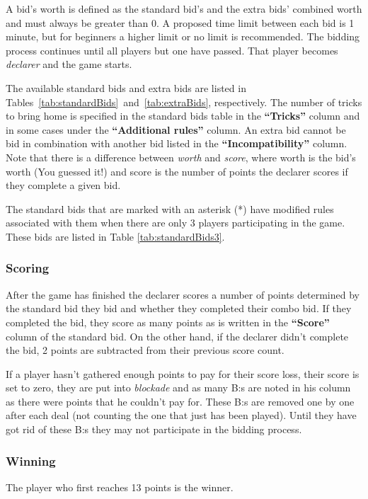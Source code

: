 \documentclass[a4paper]{article}
\begin{document}
			A bid's worth is defined as the standard bid's and the extra bids' combined worth and must always be greater than 0. A proposed time limit between each bid is 1 minute, but for beginners a higher limit or no limit is recommended. The bidding process continues until all players but one have passed. That player becomes \emph{declarer} and the game starts.
			
			The available standard bids and extra bids are listed in Tables~\ref{tab:standardBids}~and~\ref{tab:extraBids}, respectively. The number of tricks to bring home is specified in the standard bids table in the \textbf{``Tricks''} column and in some cases under the \textbf{``Additional rules''} column. An extra bid cannot be bid in combination with another bid listed in the \textbf{``Incompatibility''} column. Note that there is a difference between \emph{worth} and \emph{score}, where worth is the bid's worth (You guessed it!) and score is the number of points the declarer scores if they complete a given bid.
			
			The standard bids that are marked with an asterisk (*) have modified rules associated with them when there are only 3 players participating in the game. These bids are listed in Table \ref{tab:standardBids3}.
			
			
			
			
			\subsubsection{Scoring}
			After the game has finished the declarer scores a number of points determined by the standard bid they bid and whether they completed their combo bid. If they completed the bid, they score as many points as is written in the \textbf{``Score''} column of the standard bid. On the other hand, if the declarer didn't complete the bid, 2 points are subtracted from their previous score count.
			
			If a player hasn't gathered enough points to pay for their score loss, their score is set to zero, they are put into \emph{blockade} and as many B:s are noted in his column as there were points that he couldn't pay for. These B:s are removed one by one after each deal (not counting the one that just has been played). Until they have got rid of these B:s they may not participate in the bidding process.
			
			\subsubsection{Winning}
			The player who first reaches 13 points is the winner.
			
\end{document}
